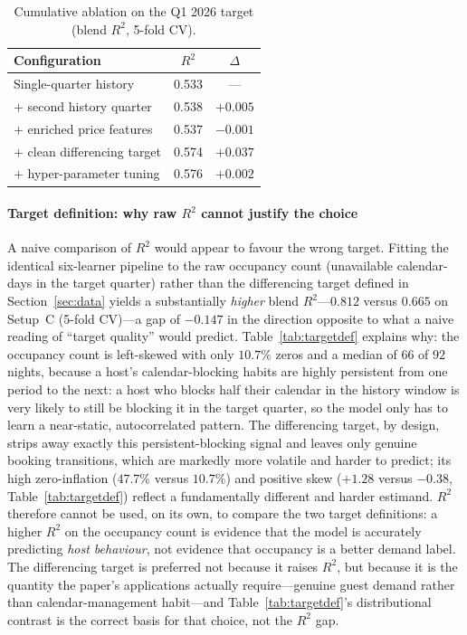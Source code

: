 \documentclass[review,12pt]{elsarticle}
\begin{document}
\begin{table}[!t]
\caption{Cumulative ablation on the Q1 2026 target (blend $R^2$, 5-fold CV).}
\label{tab:incremental}
\centering
\small
\begin{tabular}{lcc}
\toprule
Configuration & $R^2$ & $\Delta$ \\
\midrule
Single-quarter history & 0.533 & --- \\
\quad $+$ second history quarter & 0.538 & $+0.005$ \\
\quad $+$ enriched price features & 0.537 & $-0.001$ \\
\quad $+$ clean differencing target & 0.574 & $+0.037$ \\
\quad $+$ hyper-parameter tuning & 0.576 & $+0.002$ \\
\bottomrule
\end{tabular}
\end{table}

\paragraph{Target definition: why raw $R^2$ cannot justify the choice}
A naive comparison of $R^2$ would appear to favour the wrong target. Fitting the
identical six-learner pipeline to the raw occupancy count (unavailable
calendar-days in the target quarter) rather than the differencing target defined
in Section~\ref{sec:data} yields a substantially \emph{higher} blend
$R^2$---$0.812$ versus $0.665$ on Setup~C (5-fold CV)---a gap of $-0.147$ in the
direction opposite to what a naive reading of ``target quality'' would predict.
Table~\ref{tab:targetdef} explains why: the occupancy count is left-skewed with
only $10.7\%$ zeros and a median of $66$ of $92$ nights, because a host's
calendar-blocking habits are highly persistent from one period to the next: a host
who blocks half their calendar in the history window is very likely to still be
blocking it in the target quarter, so the model only has to learn a near-static,
autocorrelated pattern. The differencing target, by design, strips away exactly
this persistent-blocking signal and leaves only genuine booking transitions, which
are markedly more volatile and harder to predict; its high zero-inflation
($47.7\%$ versus $10.7\%$) and positive skew ($+1.28$ versus $-0.38$,
Table~\ref{tab:targetdef}) reflect a fundamentally different and harder estimand.
$R^2$ therefore cannot be used, on its own, to compare the two target definitions:
a higher $R^2$ on the occupancy count is evidence that the model is accurately
predicting \emph{host behaviour}, not evidence that occupancy is a better demand
label. The differencing target is preferred not because it raises $R^2$, but
because it is the quantity the paper's applications actually require---genuine
guest demand rather than calendar-management habit---and
Table~\ref{tab:targetdef}'s distributional contrast is the correct basis for that
choice, not the $R^2$ gap.
\end{document}
